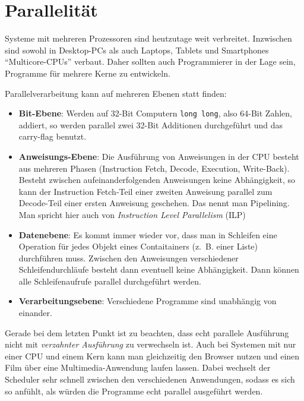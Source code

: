 \chapter{Parallelität}
Systeme mit mehreren Prozessoren sind heutzutage weit verbreitet. Inzwischen
sind sowohl in Desktop-PCs als auch Laptops, Tablets und Smartphones 
\enquote{Multicore-CPUs} verbaut. Daher sollten auch Programmierer in der Lage 
sein, Programme für mehrere Kerne zu entwickeln.

Parallelverarbeitung kann auf mehreren Ebenen statt finden:
\begin{itemize}
    \item \textbf{Bit-Ebene}: Werden auf 32-Bit Computern \texttt{long long}, also
          64-Bit Zahlen, addiert, so werden parallel zwei 32-Bit Additionen durchgeführt und
          das carry-flag benutzt.
    \item \textbf{Anweisungs-Ebene}: Die Ausführung von Anweisungen in der CPU
          besteht aus mehreren Phasen (Instruction Fetch, Decode, Execution, Write-Back).
          Besteht zwischen aufeinanderfolgenden Anweisungen keine Abhängigkeit,
          so kann der Instruction Fetch-Teil einer zweiten Anweisung parallel zum
          Decode-Teil einer ersten Anweisung geschehen. Das nennt man Pipelining.
          Man spricht hier auch von \textit{Instruction Level Parallelism} (ILP)
    \item \textbf{Datenebene}: Es kommt immer wieder vor, dass man in Schleifen
          eine Operation für jedes Objekt eines Contaitainers (z.~B. einer Liste)
          durchführen muss. Zwischen den Anweisungen verschiedener Schleifendurchläufe
          besteht dann eventuell keine Abhängigkeit. Dann können alle Schleifenaufrufe
          parallel durchgeführt werden.
    \item \textbf{Verarbeitungsebene}: Verschiedene Programme sind unabhängig
          von einander.
\end{itemize}

Gerade bei dem letzten Punkt ist zu beachten, dass echt parallele Ausführung nicht mit \textit{verzahnter Ausführung} zu verwechseln ist. Auch bei Systemen mit nur einer CPU und einem Kern kann man gleichzeitig den Browser nutzen und einen Film über eine Multimedia-Anwendung laufen lassen. Dabei wechselt der Scheduler sehr schnell zwischen den verschiedenen
Anwendungen, sodass es sich so anfühlt, als würden die Programme echt parallel
ausgeführt werden.

